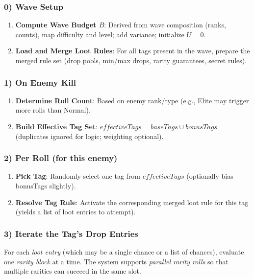 \subsubsection*{0) Wave Setup}
\begin{enumerate}
	\item \textbf{Compute Wave Budget $B$}: Derived from wave composition (ranks, counts), map difficulty and level; add variance; initialize $U=0$.
	\item \textbf{Load and Merge Loot Rules}: For all tags present in the wave, prepare the merged rule set (drop pools, min/max drops, rarity guarantees, secret rules).
\end{enumerate}

\subsubsection*{1) On Enemy Kill}
\begin{enumerate}
	\item \textbf{Determine Roll Count}: Based on enemy rank/type (e.g., Elite may trigger more rolls than Normal).
	\item \textbf{Build Effective Tag Set}: $effectiveTags = baseTags \cup bonusTags$ (duplicates ignored for logic; weighting optional).
\end{enumerate}

\subsubsection*{2) Per Roll (for this enemy)}
\begin{enumerate}
	\item \textbf{Pick Tag}: Randomly select one tag from $effectiveTags$ (optionally bias bonusTags slightly).
	\item \textbf{Resolve Tag Rule}: Activate the corresponding merged loot rule for this tag (yields a list of loot entries to attempt).
\end{enumerate}

\subsubsection*{3) Iterate the Tag’s Drop Entries}
For each \emph{loot entry} (which may be a single chance or a list of chances), evaluate one \emph{rarity block} at a time. The system supports \emph{parallel rarity rolls} so that multiple rarities can succeed in the same slot.

